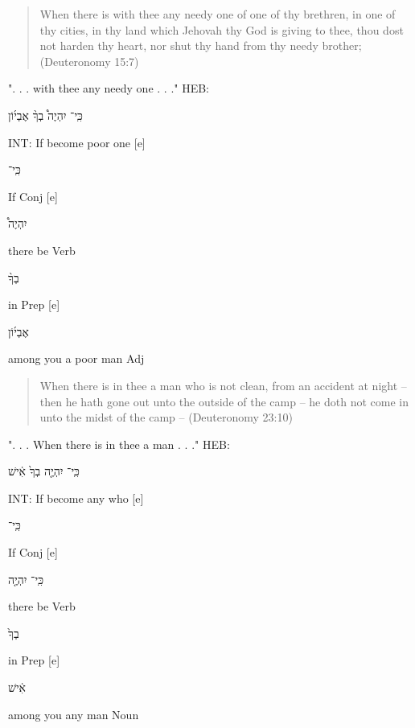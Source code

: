 \documentclass[11pt]{article}
\begin{document}
\begin{quote}
When there is with thee any needy one of one of thy brethren, in one of thy cities, in thy land which Jehovah thy God is giving to thee, thou dost not harden thy heart, nor shut thy hand from thy needy brother;
(Deuteronomy 15:7)
\end{quote}
". . . with thee any needy one . . ."
HEB:\begin{hebrew} כִּֽי־ יִהְיֶה֩ בְךָ֨ אֶבְי֜וֹן\end{hebrew}\newline
INT: If become poor one [e]%
\begin{hebrew}כִּֽי־	\end{hebrew}If	Conj [e]%
\begin{hebrew}	יִהְיֶה֩	\end{hebrew}there be	Verb\newline
\phantom{1961 [e]	} \begin{hebrew}	בְךָ֨	\end{hebrew}in	Prep [e]%
\begin{hebrew}אֶבְי֜וֹן	\end{hebrew}among you a poor man	Adj\newline \newline

\begin{quote}
When there is in thee a man who is not clean, from an accident at night -- then he hath gone out unto the outside of the camp -- he doth not come in unto the midst of the camp -- (Deuteronomy 23:10)
\end{quote}
". . . When there is in thee a man . . ." \newline
HEB:\begin{hebrew} כִּֽי־ יִהְיֶ֤ה בְךָ֙ אִ֔ישׁ\end{hebrew}\newline
INT: If become any who [e]%
\begin{hebrew}	כִּֽי־\end{hebrew}	If	Conj [e]%
\begin{hebrew} כִּֽי־ יִהְיֶ֤ה \end{hebrew}	there be	Verb\newline
\phantom{1961 [e]	}\begin{hebrew} בְךָ֙	\end{hebrew} in	Prep [e]%
\begin{hebrew} אִ֔ישׁ	\end{hebrew}among you any man	Noun\newline \newline
\end{document}
